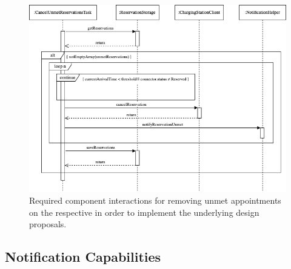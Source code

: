 \begin{figure}[h]
    \centering
    \includegraphics[scale=0.5]{resources/images/main/6_implementation/processes/scheduler/CancelUnmetReservation.png}
    \caption{Required component interactions for removing unmet appointments on the respective  in order to implement the underlying design proposals.}
    \label{fig:free-connector-seqflow}
\end{figure}

\newpage

\subsection{Notification Capabilities}
\label{ch:Implementation:sec:Reservation System:ssec:Notification Capabilities}

